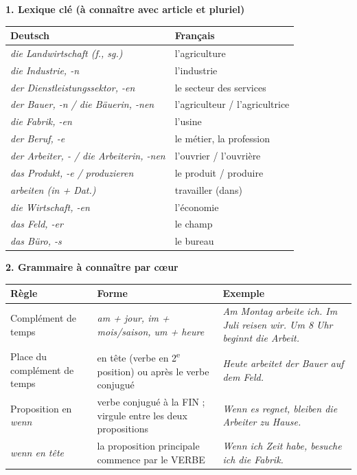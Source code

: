 \documentclass[11pt]{article}
\newcommand{\all}[1]{\ifmmode\text{\textit{#1}}\else\begingroup\selectlanguage{ngerman}\itshape #1\endgroup\fi}
\begin{document}
\begin{aretenir}
\textbf{1. Lexique clé (à connaître avec article et pluriel)}

\begin{center}
\begin{tabularx}{\linewidth}{|X|X|}
\hline
\rowcolor{popblueL} Deutsch & Français \\
\hline
\all{die Landwirtschaft} (f., sg.) & l'agriculture \\
\hline
\all{die Industrie, -n} & l'industrie \\
\hline
\all{der Dienstleistungssektor, -en} & le secteur des services \\
\hline
\all{der Bauer, -n / die Bäuerin, -nen} & l'agriculteur / l'agricultrice \\
\hline
\all{die Fabrik, -en} & l'usine \\
\hline
\all{der Beruf, -e} & le métier, la profession \\
\hline
\all{der Arbeiter, - / die Arbeiterin, -nen} & l'ouvrier / l'ouvrière \\
\hline
\all{das Produkt, -e / produzieren} & le produit / produire \\
\hline
\all{arbeiten (in + Dat.)} & travailler (dans) \\
\hline
\all{die Wirtschaft, -en} & l'économie \\
\hline
\all{das Feld, -er} & le champ \\
\hline
\all{das Büro, -s} & le bureau \\
\hline
\end{tabularx}
\end{center}

\textbf{2. Grammaire à connaître par cœur}

\begin{center}
\begin{tabularx}{\linewidth}{|l|X|X|}
\hline
\rowcolor{popblueL} Règle & Forme & Exemple \\
\hline
Complément de temps & \all{am} + jour, \all{im} + mois/saison, \all{um} + heure & \all{Am Montag arbeite ich. Im Juli reisen wir. Um 8 Uhr beginnt die Arbeit.} \\
\hline
Place du complément de temps & en tête (verbe en 2\textsuperscript{e} position) ou après le verbe conjugué & \all{Heute arbeitet der Bauer auf dem Feld.} \\
\hline
Proposition en \all{wenn} & verbe conjugué à la FIN ; virgule entre les deux propositions & \all{Wenn es regnet, bleiben die Arbeiter zu Hause.} \\
\hline
\all{wenn} en tête & la proposition principale commence par le VERBE & \all{Wenn ich Zeit habe, besuche ich die Fabrik.} \\
\hline
\end{tabularx}
\end{center}


\end{aretenir}
\end{document}
